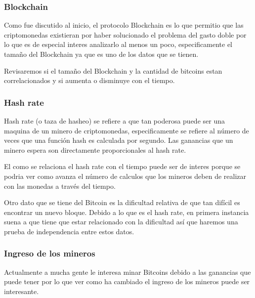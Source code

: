 \documentclass[12pt,letterpaper]{article}
\begin{document}
    \subsubsection*{Blockchain}

    Como fue discutido al inicio, el protocolo Blockchain es lo que permitio que las criptomonedas existieran por haber solucionado el problema del gasto doble por lo que es de especial interes analizarlo al menos un poco, especificamente el tamaño del Blockchain ya que es uno de los datos que se tienen.

    Revisaremos si el tamaño del Blockchain y la cantidad de bitcoins estan correlacionados y si aumenta o disminuye con el tiempo.


    \subsubsection*{Hash rate}

    Hash rate (o taza de hasheo) se refiere a que tan poderosa puede ser una maquina de un minero de criptomonedas, especificamente se refiere al número de veces que una función hash es calculada por segundo. Las ganancias que un minero espera son directamente proporcionales al hash rate.

    El como se relaciona el hash rate con el tiempo puede ser de interes porque se podria ver como avanza el número de calculos que los mineros deben de realizar con las monedas a través del tiempo.



   Otro dato que se tiene del Bitcoin es la dificultad relativa de que tan difícil es encontrar un nuevo bloque. Debido a lo que es el hash rate, en primera instancia suena a que tiene que estar relacionado con la dificultad así que haremos una prueba de independencia entre estos datos. 

   \subsubsection*{Ingreso de los mineros}

    Actualmente a mucha gente le interesa minar Bitcoins debido a las ganancias que puede tener por lo que ver como ha cambiado el ingreso de los mineros puede ser interesante.
\end{document}
